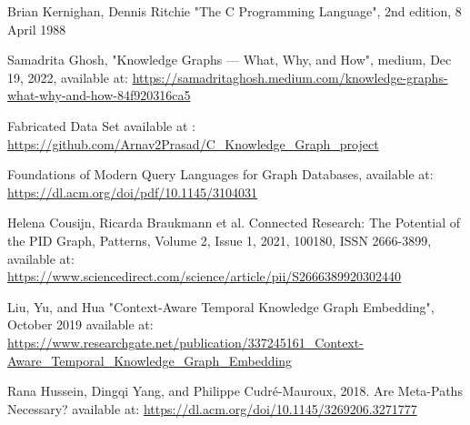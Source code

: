 \documentclass[conference]{IEEEtran}
\begin{document}
\begin{thebibliography}{00}
 Brian Kernighan, Dennis Ritchie "The C Programming Language", 2nd edition, 8 April 1988

 Samadrita Ghosh, "Knowledge Graphs — What, Why, and How", medium, Dec 19, 2022, available at: \url{https://samadritaghosh.medium.com/knowledge-graphs-what-why-and-how-84f920316ca5}

 Fabricated Data Set available at : \url{https://github.com/Arnav2Prasad/C_Knowledge_Graph_project}

 Foundations of Modern Query Languages for Graph Databases, available at: \url{https://dl.acm.org/doi/pdf/10.1145/3104031}

 Helena Cousijn, Ricarda Braukmann et al. Connected Research: The Potential of the PID Graph, Patterns, Volume 2, Issue 1, 2021, 100180, ISSN 2666-3899, available at: \url{https://www.sciencedirect.com/science/article/pii/S2666389920302440}

Liu, Yu, and Hua "Context-Aware Temporal Knowledge Graph Embedding", October 2019
available at: \url{https://www.researchgate.net/publication/337245161_Context-Aware_Temporal_Knowledge_Graph_Embedding}

Rana Hussein, Dingqi Yang, and Philippe Cudré-Mauroux, 2018. Are Meta-Paths Necessary? available at: \url{https://dl.acm.org/doi/10.1145/3269206.3271777}



\end{thebibliography}
\end{document}

